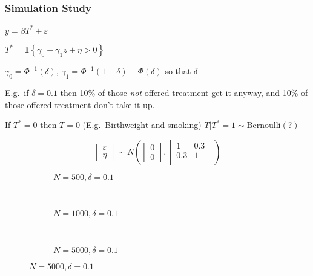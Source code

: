 \documentclass{beamer}
\begin{document}
\begin{frame}
  \frametitle{Simulation Study}
  $y = \beta T^* + \varepsilon$

  $T^* = \mathbf{1}\left\{ \gamma_0 + \gamma_1 z + \eta > 0 \right\}$

  $\gamma_0 = \Phi^{-1}(\delta)$, $\gamma_1 = \Phi^{-1}(1-\delta) - \Phi(\delta)$ so that $\delta$

  E.g.\ if $\delta=0.1$ then 10\% of those \emph{not} offered treatment get it anyway, and 10\% of those offered treatment don't take it up.
  
  If $T^*=0$ then $T=0$ (E.g.\ Birthweight and smoking)
  $T|T^*=1 \sim \mbox{Bernoulli}(?)$

  \[ \left[
  \begin{array}{c}
  \varepsilon \\ \eta
\end{array}
\right] \sim N\left( \left[
\begin{array}{c}
0 \\ 0
\end{array}
\right], \left[
\begin{array}{cc}
1 & 0.3\\
0.3 & 1 \\
\end{array}
\right]\right)\]
\end{frame}
\begin{frame}
\begin{figure}[h]
  \scriptsize
  \begingroup
  \centering
  \begin{subfigure}[b]{0.31\textwidth}
\caption{\footnotesize $N=500, \delta = 0.1$}
  
  \end{subfigure}
  ~
  \begin{subfigure}[b]{0.31\textwidth}
    \caption{\footnotesize $N=1000, \delta = 0.1$} 
  
  \end{subfigure}
  ~
  \begin{subfigure}[b]{0.31\textwidth}
\caption{\footnotesize $N=5000, \delta = 0.1$}
  
  \end{subfigure}
\endgroup
\end{figure}
\end{frame}
\end{document}
